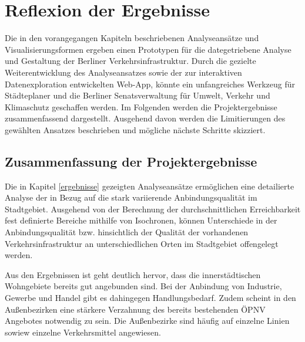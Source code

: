 \newpage
\section{Reflexion der Ergebnisse} \label{fazit}
Die in den vorangegangen Kapiteln beschriebenen Analyseansätze und Visualisierungsformen ergeben einen Prototypen für die dategetriebene Analyse und Gestaltung der Berliner Verkehrsinfrastruktur. Durch die gezielte Weiterentwicklung des Analyseansatzes sowie der zur interaktiven Datenexploration entwickelten Web-App, könnte ein unfangreiches Werkzeug für Städteplaner und die Berliner Senatsverwaltung für Umwelt, Verkehr und Klimaschutz geschaffen werden. Im Folgenden werden die Projektergebnisse zusammenfassend dargestellt. Ausgehend davon werden die Limitierungen des gewählten Ansatzes beschrieben und mögliche nächste Schritte skizziert.

\subsection{Zusammenfassung der Projektergebnisse}
Die in Kapitel \ref{ergebnisse} gezeigten Analyseansätze ermöglichen eine detailierte Analyse der in Bezug auf die stark variierende Anbindungsqualität im Stadtgebiet. Ausgehend von der Berechnung der durchschnittlichen Erreichbarkeit fest definierte Bereiche mithilfe von Isochronen, können Unterschiede in der Anbindungsqualität bzw. hinsichtlich der Qualität der vorhandenen Verkehrsinfrastruktur an unterschiedlichen Orten im Stadtgebiet offengelegt werden. 

Aus den Ergebnissen ist geht deutlich hervor, dass die innerstädtischen Wohngebiete bereits gut angebunden sind. Bei der Anbindung von Industrie, Gewerbe und Handel gibt es dahingegen Handlungsbedarf. Zudem scheint in den Außenbezirken eine stärkere Verzahnung des bereits bestehenden ÖPNV Angebotes notwendig zu sein. Die Außenbezirke sind häufig auf einzelne Linien sowiew einzelne Verkehrsmittel angewiesen. 



